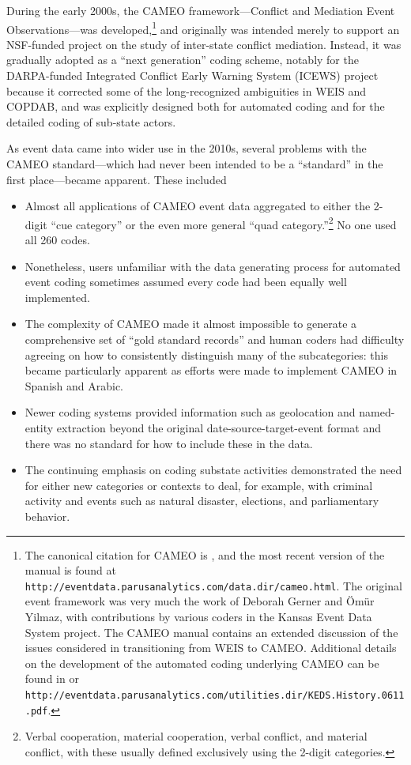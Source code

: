 \documentclass[11pt]{report}
\newcommand{\fn}[1]{\footnote{#1}}
\begin{document}
During the early 2000s, the CAMEO framework---Conflict and Mediation Event Observations---was developed,\footnote{The canonical citation for CAMEO is \cite{SGY09}, and the most recent version of the manual is found at \texttt{http://eventdata.parusanalytics.com/data.dir/cameo.html}.  The original event framework was very much the work of Deborah Gerner and \"Om\"ur Yilmaz, with contributions by various coders in the Kansas Event Data System project. The CAMEO manual contains an extended discussion of the issues considered in transitioning from WEIS to CAMEO. Additional details on the development of the automated coding underlying CAMEO can be found in \cite{Schrodt06TPM} or \texttt{http://eventdata.parusanalytics.com/utilities.dir/KEDS.History.0611.pdf}. } and originally was intended merely to support an NSF-funded project on the study of inter-state conflict mediation. Instead, it was gradually adopted as a ``next generation'' coding scheme, notably for the DARPA-funded Integrated Conflict Early Warning System (ICEWS) project \citep{OBrien10} because it corrected some of the long-recognized ambiguities in WEIS and COPDAB, and was explicitly designed both for automated coding and for the detailed coding of sub-state actors. 

As event data came into wider use in the 2010s, several problems with the CAMEO standard---which had never been intended to be a ``standard'' in the first place---became apparent. These included

\begin{itemize}
\item Almost all applications of CAMEO event data aggregated to either the 2-digit ``cue category'' or the even more general ``quad category.''\fn{Verbal cooperation, material cooperation, verbal conflict, and material conflict, with these usually defined exclusively using the 2-digit categories.} No one used all 260 codes.
\item Nonetheless, users unfamiliar with the data generating process for automated event coding sometimes assumed every code had been equally well implemented.
\item The complexity of CAMEO made it almost impossible to generate a comprehensive set of ``gold standard records'' and human coders had difficulty agreeing on how to consistently distinguish many of the subcategories: this became particularly apparent as efforts were made to implement CAMEO in Spanish and Arabic.
\item Newer coding systems provided information such as geolocation and named-entity extraction beyond the original date-source-target-event format and there was no standard for how to include these in the data.
\item The continuing emphasis on coding substate activities demonstrated the need for either new categories or contexts to deal, for example, with criminal activity and events such as natural disaster, elections, and parliamentary behavior.
\end{itemize}
\end{document}

